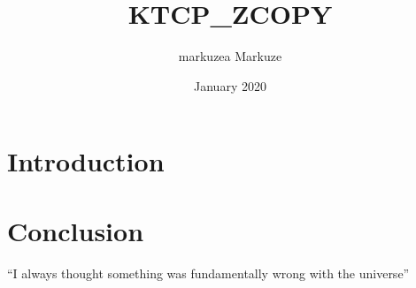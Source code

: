 \documentclass[newfonts=false,format=sigconf,9pt,letterpaper]{acmart}
\title{KTCP\_ZCOPY}
\author{markuzea Markuze}
\date{January 2020}
\begin{document}
\maketitle

\section{Introduction}




\section{Conclusion}
``I always thought something was fundamentally wrong with the universe'' \citep{adams1995hitchhiker}



\end{document}
